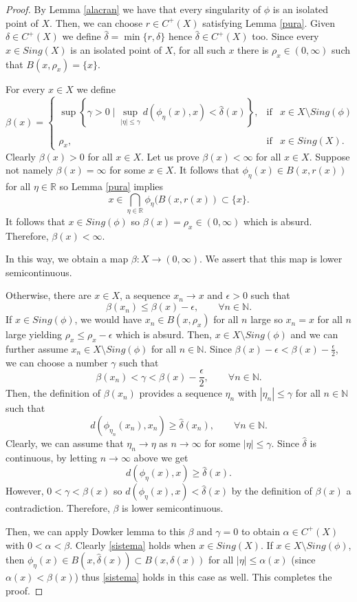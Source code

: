 \documentclass[11pt,letterpaper]{amsart}
\begin{document}
\begin{proof}
By Lemma \ref{alacran} we have that every singularity of $\phi$ is an isolated point of $X$.
Then, we can choose $r\in C^+(X)$ satisfying Lemma \ref{pura}.
Given $\delta\in C^+(X)$ we define $\hat{\delta}=\min\{r,\delta\}$ hence
$\hat{\delta}\in C^+(X)$ too.
Since every $x\in Sing(X)$ is an isolated point of $X$, for all such $x$ there is $\rho_x\in (0,\infty)$ such that $B(x,\rho_x)=\{x\}$.

For every $x\in X$ we define
$$
\beta(x) = \left\{
\begin{array}{rcl}
\sup\left\{\gamma>0\mid \displaystyle\sup_{|\eta|\leq \gamma}d(\phi_\eta(x),x)< \hat{\delta}(x)\right\}, & \mbox{if} & x\in X\setminus Sing(\phi)\\
& & \\
\rho_x,& \mbox{if} & x\in Sing(X).
\end{array}
\right.
$$
Clearly $\beta(x)>0$ for all $x\in X$.
Let us prove $\beta(x)<\infty$ for all $x\in X$.
Suppose not namely $\beta(x)=\infty$ for some $x\in X$.
It follows that
$\phi_\eta(x)\in B(x,r(x))$ for all $\eta\in\mathbb{R}$ so Lemma \ref{pura} implies
$$
x\in \bigcap_{\eta\in\mathbb{R}}\phi_\eta(B(x,r(x))\subset\{x\}.
$$
It follows that $x\in Sing(\phi)$ so $\beta(x)=\rho_x\in (0,\infty)$ which is absurd.
Therefore, $\beta(x)<\infty$.

In this way, we obtain a map $\beta:X\to (0,\infty)$.
We assert that this map is lower semicontinuous.

Otherwise, there are $x\in X$, a sequence $x_n\to x$ and $\epsilon>0$ such that
$$
\beta(x_n)\leq \beta(x)-\epsilon,\quad\quad\forall n\in\mathbb{N}.
$$
If $x\in Sing(\phi)$, we would have $x_n\in B(x,\rho_x)$ for all $n$ large so
$x_n=x$ for all $n$ large yielding $\rho_x\leq \rho_x-\epsilon$ which is absurd.
Then, $x\in X\setminus Sing(\phi)$ and we can further assume $x_n\in X\setminus Sing(\phi)$ for all $n\in\mathbb{N}$.
Since $\beta(x)-\epsilon<\beta(x)-\frac{\epsilon}2$, we can choose a number $\gamma$ such that
$$
\beta(x_n)<\gamma<\beta(x)-\frac{\epsilon}2,\quad\quad
\forall n\in\mathbb{N}.
$$
Then, the definition of $\beta(x_n)$ provides a sequence $\eta_n$ with $|\eta_n|\leq \gamma$ for all $n\in\mathbb{N}$ such that
$$
d(\phi_{\eta_n}(x_n),x_n)\geq \hat{\delta}(x_n),\quad\quad\forall n\in\mathbb{N}.
$$
Clearly, we can assume that $\eta_n\to \eta$ as $n\to\infty$ for some $|\eta|\leq \gamma$.
Since $\hat{\delta}$ is continuous, by letting $n\to\infty$ above we get
$$
d(\phi_\eta(x),x)\geq \hat{\delta}(x).
$$
However, $0<\gamma<\beta(x)$ so
$d(\phi_\eta(x),x)<\hat{\delta}(x)$ by the definition of $\beta(x)$ a contradiction. Therefore, $\beta$ is lower semicontinuous.


Then, we can apply Dowker lemma to this $\beta$ and $\gamma=0$ to obtain
$\alpha\in C^+(X)$ with $0<\alpha<\beta$.
Clearly \eqref{sistema} holds when $x\in Sing(X)$.
If $x\in X\setminus Sing(\phi)$, then $\phi_\eta(x)\in B(x,\hat{\delta}(x))\subset B(x,\delta(x))$ for all $|\eta|\leq \alpha(x)$ (since $\alpha(x)<\beta(x)$) thus \eqref{sistema} holds in this case as well. This completes the proof.
\end{proof}
\end{document}
